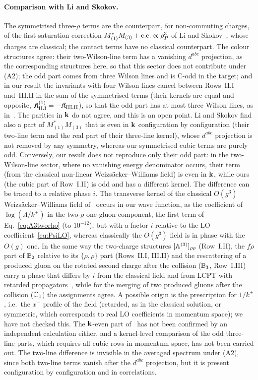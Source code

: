 \paragraph{Comparison with Li and Skokov.} The symmetrised three-$\rho$ terms are the counterpart, for non-commuting charges, of the first saturation correction $M_{(1)}^*M_{(3)}+{\rm c.c.}\propto\rho_P^3$ of Li and Skokov~\cite{Li:2021ntm}, whose charges are classical; the contact terms have no classical counterpart. The colour structures agree: their two-Wilson-line term has a vanishing $d^{abc}$ projection, as the corresponding structures here, so that this sector does not contribute under (A2); the odd part comes from three Wilson lines and is C-odd in the target; and in our result the invariants with four Wilson lines cancel between Rows~II.I and~III.II in the sum of the symmetrised terms (their kernels are equal and opposite, $\mathfrak K^{(1)}_{\rm II.I}=-\mathfrak K_{\rm III.II}$), so that the odd part has at most three Wilson lines, as in~\cite{McLerran:2016snu,Li:2021ntm}. The parities in $\mathbf{k}$ do not agree, and this is an open point. Li and Skokov find also a part of $M_{(1)}^*M_{(3)}$ that is even in $\mathbf{k}$ configuration by configuration (their two-line term and the real part of their three-line kernel), whose $d^{abc}$ projection is not removed by any symmetry, whereas our symmetrised cubic terms are purely odd. Conversely, our result does not reproduce only their odd part: in the two-Wilson-line sector, where no vanishing energy denominator occurs, their term (from the classical non-linear Weizs\"acker--Williams field) is even in $\mathbf{k}$, while ours (the cubic part of Row~I.II) is odd and has a different kernel. The difference can be traced to a relative phase $i$. The transverse kernel of the classical $O(g^3)$ Weizs\"acker--Williams field of~\cite{Li:2021ntm} occurs in our wave function, as the coefficient of $\log(\Lambda/k^+)$ in the two-$\rho$ one-gluon component, the first term of Eq.~\eqref{eq:A3tworho} (to $10^{-12}$), but with a factor $i$ relative to the LO coefficient~\eqref{eq:PsiLO}, whereas classically the $O(g^3)$ field is in phase with the $O(g)$ one. In the same way the two-charge structures $[\mathbb{A}^{(3)}]_{\rho\rho}$ (Row~I.II), the $f\rho$ part of $\mathbb{B}_2$ relative to its $\{\rho,\rho\}$ part (Rows~II.I, III.II) and the rescattering of a produced gluon on the rotated second charge after the collision ($\mathbb{B}_3$, Row~I.III) carry a phase that differs by $i$ from the classical field and from LCPT with retarded propagators~\cite{Kovchegov:2018jun}, while for the merging of two produced gluons after the collision ($\mathbb{C}_1$) the assignments agree. A possible origin is the prescription for $1/k^+$, i.e.\ the $x^-$ profile of the field (retarded, as in the classical solution, or symmetric, which corresponds to real LO coefficients in momentum space); we have not checked this. The $\mathbf{k}$-even part of~\cite{Li:2021ntm} has not been confirmed by an independent calculation either, and a kernel-level comparison of the odd three-line parts, which requires all cubic rows in momentum space, has not been carried out. The two-line difference is invisible in the averaged spectrum under (A2), since both two-line terms vanish after the $d^{abc}$ projection, but it is present configuration by configuration and in correlations.

